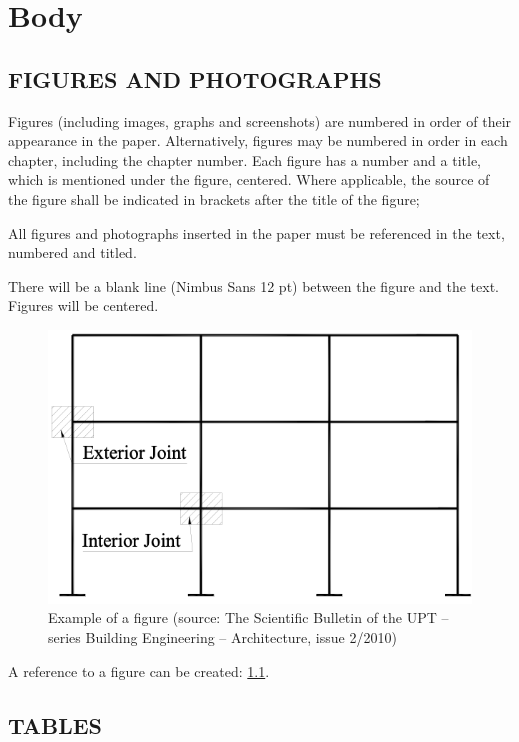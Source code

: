 \chapter{Body}
\thispagestyle{pagestyle}

\section{FIGURES AND PHOTOGRAPHS}

Figures (including images, graphs and screenshots) are numbered in order of their appearance in the paper. Alternatively, figures may be numbered in order in each chapter, including the chapter number. Each figure has a number and a title, which is mentioned under the figure, centered. Where applicable, the source of the figure shall be indicated in brackets after the title of the figure;

All figures and photographs inserted in the paper must be referenced in the text, numbered and titled.

There will be a blank line (Nimbus Sans 12 pt) between the figure and the text. Figures will be centered.

\begin{figure}[h]
\includegraphics{images/Picture 1.png}
\caption{Example of a figure (source: The Scientific Bulletin of the UPT – series Building Engineering – Architecture, issue 2/2010)}
\label{fig:myfig}
\end{figure}

A reference to a figure can be created: \cref{fig:myfig}. 

\section{TABLES}

